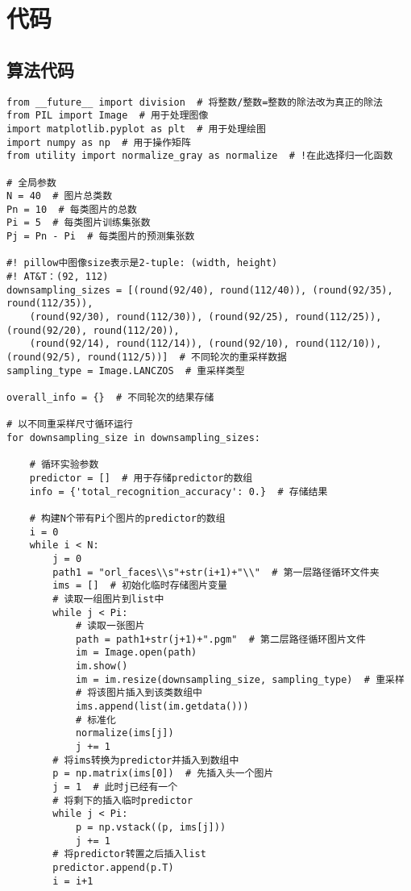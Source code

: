 \appendixpage
\section{代码}
\subsection{算法代码}
\begin{verbatim}
from __future__ import division  # 将整数/整数=整数的除法改为真正的除法
from PIL import Image  # 用于处理图像
import matplotlib.pyplot as plt  # 用于处理绘图
import numpy as np  # 用于操作矩阵
from utility import normalize_gray as normalize  # !在此选择归一化函数

# 全局参数
N = 40  # 图片总类数
Pn = 10  # 每类图片的总数
Pi = 5  # 每类图片训练集张数
Pj = Pn - Pi  # 每类图片的预测集张数

#! pillow中图像size表示是2-tuple: (width, height)
#! AT&T：(92, 112)
downsampling_sizes = [(round(92/40), round(112/40)), (round(92/35), round(112/35)), 
    (round(92/30), round(112/30)), (round(92/25), round(112/25)), (round(92/20), round(112/20)), 
    (round(92/14), round(112/14)), (round(92/10), round(112/10)), (round(92/5), round(112/5))]  # 不同轮次的重采样数据
sampling_type = Image.LANCZOS  # 重采样类型

overall_info = {}  # 不同轮次的结果存储

# 以不同重采样尺寸循环运行
for downsampling_size in downsampling_sizes:

    # 循环实验参数
    predictor = []  # 用于存储predictor的数组
    info = {'total_recognition_accuracy': 0.}  # 存储结果

    # 构建N个带有Pi个图片的predictor的数组
    i = 0
    while i < N:
        j = 0
        path1 = "orl_faces\\s"+str(i+1)+"\\"  # 第一层路径循环文件夹
        ims = []  # 初始化临时存储图片变量
        # 读取一组图片到list中
        while j < Pi:
            # 读取一张图片
            path = path1+str(j+1)+".pgm"  # 第二层路径循环图片文件
            im = Image.open(path)
            im.show()
            im = im.resize(downsampling_size, sampling_type)  # 重采样
            # 将该图片插入到该类数组中
            ims.append(list(im.getdata()))
            # 标准化
            normalize(ims[j])
            j += 1
        # 将ims转换为predictor并插入到数组中
        p = np.matrix(ims[0])  # 先插入头一个图片
        j = 1  # 此时j已经有一个
        # 将剩下的插入临时predictor
        while j < Pi:
            p = np.vstack((p, ims[j]))
            j += 1
        # 将predictor转置之后插入list
        predictor.append(p.T)
        i = i+1


\end{verbatim}
